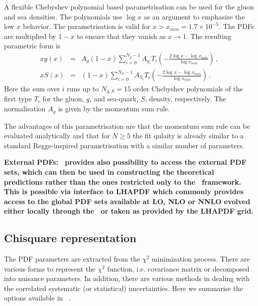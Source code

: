 \begin{description}
A flexible Chebyshev polynomial based parametrisation can be used for the gluon and sea densities. The polynomials
use $\log x$ as an argument to emphasize the low $x$ behavior. 
The parametrisation is valid for $x>x_{min} = 1.7\times 10^{-5}$. The PDFs are multiplied
by $1-x$ to ensure that they vanish as $x\to 1$. The resulting parametric form is 
\begin{eqnarray}
x g(x) &=& A_g \left(1-x\right) \sum_{i=0}^{N_g-1} A_{g_i} T_i \left(-\frac{\textstyle 2\log x - \log x_{min} } {\textstyle \log x_{min} } \right)\,, \label{eq:glu} \\
x S(x) &=& \left(1-x\right) \sum_{i=0}^{N_S-1} A_{S_i} T_i \left(-\frac{\textstyle 2\log x - \log x_{min} } {\textstyle \log x_{min} } \right)\,. \label{eq:sea} 
\end{eqnarray}
Here the sum over $i$ runs up to $N_{g,S}=15$ order Chebyshev polynomials of the first type $T_i$ for
the gluon, $g$, and sea-quark, $S$, density, respectively. 
The normalisation $A_g$ is given by the momentum sum rule.

The advantages of this parametrisation are that the momentum sum rule can be evaluated analytically 
and that for $N \ge 5$ the fit qulaity is already similar
to a standard Regge-inspired parametrisation with a similar number of parameters.

\item \bf{External PDFs:} \rm 
\fitter\ provides also possibility to access the  external PDF sets, which can then be used in constructing the theoretical predictions rather than the ones restricted only to the \fitter\ framework. This is possible via interface to LHAPDF which commonly provides access to the global PDF sets available at LO, NLO or NNLO evolved either locally through the \fitter\ or taken as provided by the LHAPDF grid.

\end{description}


\subsection{Chisquare representation}


The PDF parameters are extracted from the $\chi^2$ minimization process. 
There are various forms to represent the $\chi^2$ function, i.e. covariance matrix or decomposed into nuisance parameters. In addition, there are various methods in dealing with the correlated systematic (or statistical) uncertainties. Here we summarise the options available in \fitter\ . 


